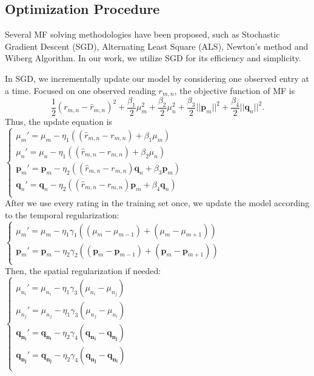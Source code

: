 \subsection{Optimization Procedure}
\label{optimation_procedure}
Several MF solving methodologies have been proposed, such as Stochastic Gradient Descent (SGD)\cite{koren2009matrix,chih2008large}, Alternating Least Square (ALS)\cite{koren2009matrix,zhou2008large}, Newton's method\cite{buchanan2005damped} and Wiberg Algorithm\cite{okatani2007wiberg}.
In our work, we utilize SGD for its efficiency and simplicity. 

In SGD, we incrementally update our model by considering one observed entry at a time.
Focused on one observed reading $r_{m,n}$, the objective function of MF is
\begin{equation*} \frac{1}{2}(r_{m,n} - \hat{r}_{m,n})^2 + \frac{\beta_1}{2}\mu_m^2 + \frac{\beta_2}{2}\mu_n^2 + \frac{\beta_3}{2}||\mathbf{p}_m||^2 + \frac{\beta_4}{2}||\mathbf{q}_n||^2.\end{equation*}
Thus, the update equation is\\
\indent	$\begin{cases}
	\mu_m' = \mu_m - \eta_1 ((\hat{r}_{m,n}-r_{m,n}) + \beta_1 \mu_m) \\
	\mu_n' = \mu_n - \eta_1 ((\hat{r}_{m,n}-r_{m,n}) + \beta_2 \mu_n) \\
	\mathbf{p}_{m}' = \mathbf{p}_{m} - \eta_2 ((\hat{r}_{m,n}-r_{m,n})\mathbf{q}_{n} + \beta_3 \mathbf{p}_{m})\\
	\mathbf{q}_{n}' = \mathbf{q}_{n} - \eta_2 ((\hat{r}_{m,n}-r_{m,n})\mathbf{p}_{m} + \beta_4 \mathbf{q}_{n})\\
	\end{cases}$\\
After we use every rating in the training set once, we update the model according to the temporal regularization:\\
\indent $\begin{cases}
	\mu_m' = \mu_m - \eta_1 \gamma_1((\mu_m-\mu_{m-1})+(\mu_m-\mu_{m+1}))\\
	\mathbf{p}_{m}' = \mathbf{p}_{m} - \eta_2 \gamma_2((\mathbf{p}_{m}-\mathbf{p}_{m-1})+(\mathbf{p}_{m}-\mathbf{p}_{m+1}))\\
	\end{cases}$\\
Then, the spatial regularization if needed:\\
\indent $\begin{cases}
	\mu_{n_i}' = \mu_{n_i} - \eta_1 \gamma_3 (\mu_{n_i} - \mu_{n_j})\\
	\mu_{n_j}' = \mu_{n_j} - \eta_1 \gamma_3 (\mu_{n_j} - \mu_{n_i})\\
	\mathbf{q_{n_i}}' = \mathbf{q_{n_i}} - \eta_2 \gamma_4 (\mathbf{q_{n_i}} - \mathbf{q_{n_j}})\\
	\mathbf{q_{n_j}}' = \mathbf{q_{n_j}} - \eta_2 \gamma_4 (\mathbf{q_{n_j}} - \mathbf{q_{n_i}})\\
	\end{cases}$\\


